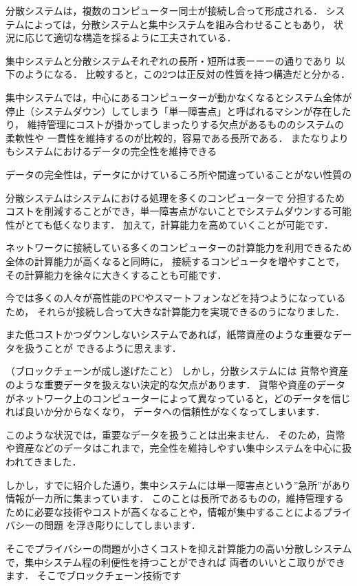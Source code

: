 \documentclass[a4paper,12pt]{jsarticle}
\begin{document}
分散システムは，複数のコンピューター同士が接続し合って形成される．
システムによっては，分散システムと集中システムを組み合わせることもあり，
状況に応じて適切な構造を採るように工夫されている．

集中システムと分散システムそれぞれの長所・短所は表ーーーの通りであり
以下のようになる．
比較すると，この2つは正反対の性質を持つ構造だと分かる．

集中システムでは，中心にあるコンピューターが動かなくなるとシステム全体が
停止（システムダウン）してしまう「単一障害点」と呼ばれるマシンが存在したり，
維持管理にコストが掛かってしまったりする欠点があるもののシステムの柔軟性や
一貫性を維持するのが比較的，容易である長所である．
またなりよりもシステムにおけるデータの完全性を維持できる

データの完全性は，データにかけているころ所や間違っていることがない性質の

分散システムはシステムにおける処理を多くのコンピューターで
分担するためコストを削減することができ，単一障害点がないことでシステムダウンする可能性がとても低くなります．
加えて，計算能力を高めていくことが可能です．

ネットワークに接続している多くのコンピューターの計算能力を利用できるため全体の計算能力が高くなると同時に，
接続するコンピュータを増やすことで，その計算能力を徐々に大きくすることも可能です．

今では多くの人々が高性能のPCやスマートフォンなどを持つようになっているため，
それらが接続し合って大きな計算能力を実現できるのうになりました．

また低コストかつダウンしないシステムであれば，紙幣資産のような重要なデータを扱うことが
できるように思えます．

（ブロックチェーンが成し遂げたこと）
しかし，分散システムには
貨幣や資産のような重要データを扱えない決定的な欠点があります．
貨幣や資産のデータがネットワーク上のコンピューターによって異なっていると，どのデータを信じれば良いか分からなくなり，
データへの信頼性がなくなってしまいます．

このような状況では，重要なデータを扱うことは出来ません．
そのため，貨幣や資産などのデータはこれまで，完全性を維持しやすい集中システムを中心に扱われてきました．

しかし，すでに紹介した通り，集中システムには単一障害点という”急所”があり情報が一カ所に集まっています．
このことは長所であるものの，維持管理するために必要な技術やコストが高くなることや，情報が集中することによるプライバシーの問題
を浮き彫りにしてしまいます．

そこでプライバシーの問題が小さくコストを抑え計算能力の高い分散しシステムで，集中システム程の利便性を持つことができれば
両者のいいとこ取りができます．
そこでブロックチェーン技術です
\end{document}
